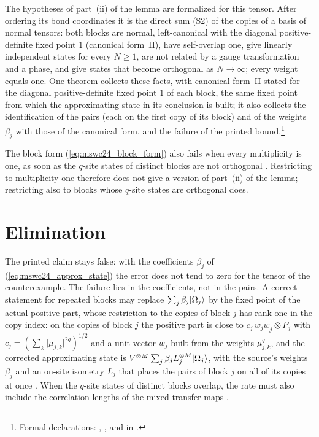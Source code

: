 \documentclass{article}
\begin{document}
The hypotheses of part~(ii) of the lemma are formalized for this tensor. After
ordering its bond coordinates it is the direct sum (S2) of the copies of a basis
of normal tensors: both blocks are normal, left-canonical with the diagonal
positive-definite fixed point $1$ (canonical form~II), have self-overlap one, give
linearly independent states for every $N\geq1$, are not related by a gauge
transformation and a phase, and give states that become orthogonal as
$N\to\infty$; every weight equals one. One theorem collects these
facts, with canonical form~II stated for the diagonal
positive-definite fixed point $1$ of each block, the same fixed point from which
the approximating state in its conclusion is built; it also collects the identification of the pairs (each on the first copy of its block) and of
the weights $\beta_j$ with those of the canonical form, and the failure of the
printed bound.\footnote{Formal declarations:
    ,
    ,
     and
     in
    .}

The block form (\ref{eq:mswc24_block_form}) also fails when every multiplicity is
one, as soon as the $q$-site states of distinct blocks are not orthogonal
\cite{gap:mswc24_block_form_mixed_overlap}. Restricting to multiplicity one
therefore does not give a version of part~(ii) of the lemma; restricting also to
blocks whose $q$-site states are orthogonal does.

\section{Elimination}
The printed claim stays false: with the coefficients $\beta_j$ of
(\ref{eq:mswc24_approx_state}) the error does not tend to zero for the tensor of the
counterexample. The failure lies in the coefficients, not in the pairs. A correct statement
for repeated blocks may replace $\sum_j\beta_j|\Omega_j\rangle$ by the fixed point of the actual
positive part, whose restriction to the copies of block $j$ has rank one in the copy index:
on the copies of block $j$ the positive part is close to $c_j\,w_jw_j^\dagger\otimes P_j$ with
$c_j=(\sum_k\lvert\mu_{j,k}\rvert^{2q})^{1/2}$ and a unit vector $w_j$ built from the weights
$\mu_{j,k}^q$, and the corrected approximating state is
$V^{\otimes M}\sum_j\beta_jL_j^{\otimes M}|\Omega_j\rangle$, with the source's weights
$\beta_j$ and an on-site isometry $L_j$ that places the pairs of block $j$ on all of its
copies at once \cite{gap:mswc24_repeated_block_corrected_state}. When the $q$-site states of
distinct blocks overlap, the rate must also include the correlation lengths of the mixed
transfer maps \cite{gap:mswc24_block_form_mixed_overlap}.
\end{document}
